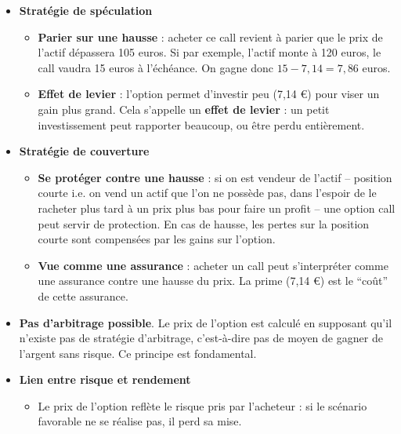 \documentclass[12pt,a4paper]{article}
\begin{document}
\begin{itemize}

    \item \textbf{Stratégie de spéculation}

    \begin{itemize}
        \item \textbf{Parier sur une hausse} : acheter ce call revient à parier que le prix de l’actif dépassera 105 euros. Si par exemple, l’actif monte à 120 euros, le call vaudra 15 euros à l’échéance. On gagne donc \( 15 - 7{,}14 = 7{,}86 \) euros.
        
        \item \textbf{Effet de levier} : l’option permet d’investir peu (7,14 €) pour viser un gain plus grand. Cela s’appelle un \textbf{effet de levier} : un petit investissement peut rapporter beaucoup, ou être perdu entièrement.
    \end{itemize}

    \item \textbf{Stratégie de couverture}

    \begin{itemize}
        \item \textbf{Se protéger contre une hausse} : si on est vendeur de l’actif -- position courte i.e. on vend un actif que l’on ne possède pas, dans l’espoir de le racheter plus tard à un prix plus bas pour faire un profit -- une option call peut servir de protection. En cas de hausse, les pertes sur la position courte sont compensées par les gains sur l’option.
        
        \item \textbf{Vue comme une assurance} : acheter un call peut s’interpréter comme une assurance contre une hausse du prix. La prime (7,14 €) est le “coût” de cette assurance.
    \end{itemize}

    \item \textbf{Pas d’arbitrage possible}. Le prix de l’option est calculé en supposant qu’il n’existe pas de stratégie d’arbitrage, c’est-à-dire pas de moyen de gagner de l’argent sans risque. Ce principe est fondamental.

    \item \textbf{Lien entre risque et rendement}

    \begin{itemize}
        \item Le prix de l’option reflète le risque pris par l’acheteur : si le scénario favorable ne se réalise pas, il perd sa mise.
        

\end{itemize}
\end{itemize}
\end{document}
